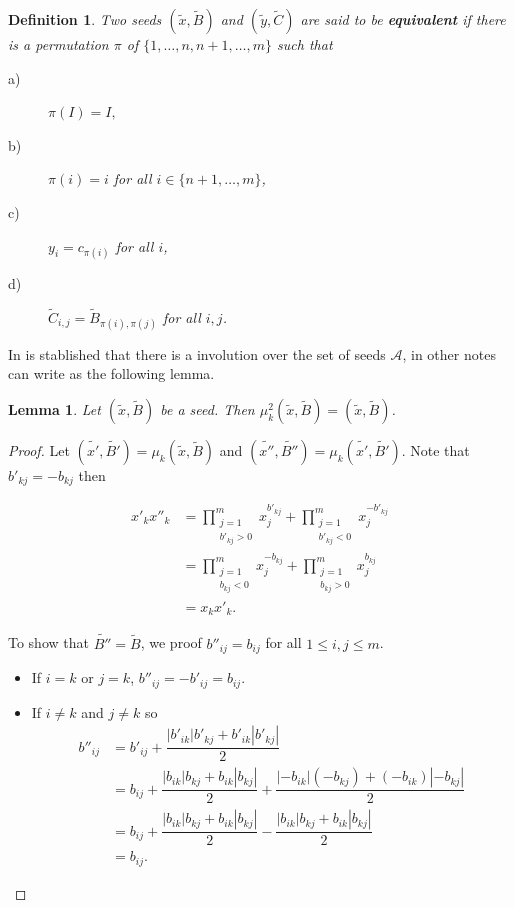 \documentclass[12pt,a4paper]{article}
\newtheorem{Lemma}[Theorem]{Lemma}
\newtheorem{definition}[Theorem]{Definition}
\begin{document}
\begin{definition}
Two seeds $(\tilde{x},\tilde{B})$ and $(\tilde{y},\tilde{C})$ are said to be \textbf{equivalent} if there is a permutation $\pi$ of $\{ 1,\ldots, n, n+1, \ldots, m\}$ such that
\begin{description}
\item[a)] $\pi(I)=I,$
\item[b)] $\pi(i)=i$ for all $i \in \{ n+1, \ldots, m\}$,
\item[c)] $y_i=c_{\pi(i)}$ for all $i$,
\item[d)] $\tilde{C}_{i,j} = \tilde{B}_{\pi(i),\pi(j)}$ for all $i,j$.
\end{description}
\end{definition}

In \cite{fomin1} is stablished that there is a involution over the set of seeds $\mathcal{A}$, in other notes can write as the following lemma. 

\begin{Lemma}
Let $(\tilde{x},\tilde{B})$ be a seed. Then $\mu^2_k(\tilde{x},\tilde{B})=(\tilde{x},\tilde{B})$.
\label{lema1}
\end{Lemma}

\begin{proof}
Let $(\tilde{x'},\tilde{B'})=\mu_{k}(\tilde{x},\tilde{B})$ and $(\tilde{x''},\tilde{B''})=\mu_{k}(\tilde{x'},\tilde{B'})$. Note that $b'_{kj}=-b_{kj}$ then

$$\begin{array}{rl}
{x'}_k{x''}_k & = \prod^{m}_{\substack{j=1 \\ {b'}_{kj}>0}}{x}_{j}^{{b'}_{kj}}+ \prod^{m}_{\substack{j=1 \\ {b'}_{kj}<0}}{x}_{j}^{{-b'}_{kj}} \\
 & = \prod^{m}_{\substack{j=1 \\ {b}_{kj}<0}}{x}_{j}^{-{b}_{kj}}+ \prod^{m}_{\substack{j=1 \\ {b}_{kj}>0}}{x}_{j}^{{b}_{kj}} \\
 & = x_kx'_k.
\end{array}$$

To show that $\tilde{B''}=\tilde{B}$, we proof ${b''}_{ij}=b_{ij}$ for all $1\leq i,j \leq m$.

\begin{itemize}
\item If $i=k$ or $j=k$, ${b''}_{ij}=-{b'}_{ij}=b_{ij}$.
\item If $i\neq k$ and $j \neq k$ so
$$\begin{array}{rl}
{b''}_{ij} & = {b'}_{ij}+\dfrac{|{b'}_{ik}|{b'}_{kj}+{b'}_{ik}|{b'}_{kj}|}{2} \\
 & = b_{ij} + \dfrac{|b_{ik}|b_{kj}+b_{ik}|b_{kj}|}{2} + \dfrac{|-b_{ik}|(-b_{kj})+(-b_{ik})|-b_{kj}|}{2} \\
  & = b_{ij} + \dfrac{|b_{ik}|b_{kj}+b_{ik}|b_{kj}|}{2} - \dfrac{|b_{ik}|b_{kj}+b_{ik}|b_{kj}|}{2} \\
  & = b_{ij}.
\end{array}$$
\end{itemize}

\end{proof}
\end{document}
